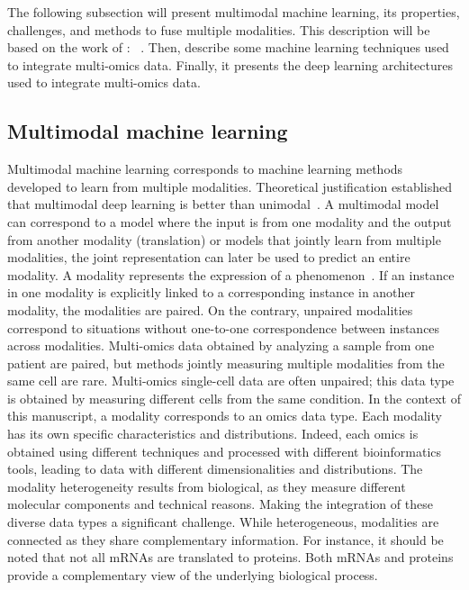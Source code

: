\documentclass[../main.tex]{subfiles}
\begin{document}
	The following subsection will present multimodal machine learning, its properties, challenges, and methods to fuse multiple modalities.
	This description will be based on the work of \citeauthor{MML_morency}: ~\cite{MML_morency}.
	Then, describe some machine learning techniques used to integrate multi-omics data.
	Finally, it presents the deep learning architectures used to integrate multi-omics data.

	\subsection{Multimodal machine learning}
	  Multimodal machine learning corresponds to machine learning methods developed to learn from multiple modalities.
	  Theoretical justification established that multimodal deep learning is better than unimodal~\cite{NEURIPS2021_5aa3405a}.
	  A multimodal model can correspond to a model where the input is from one modality and the output from another modality (translation) or models that jointly learn from multiple modalities, the joint representation can later be used to predict an entire modality.
	  A modality represents the expression of a phenomenon~\cite{MML_morency}.
	  If an instance in one modality is explicitly linked to a corresponding instance in another modality, the modalities are paired.
	  On the contrary, unpaired modalities correspond to situations without one-to-one correspondence between instances across modalities.
	  Multi-omics data obtained by analyzing a sample from one patient are paired, but methods jointly measuring multiple modalities from the same cell are rare.
	  Multi-omics single-cell data are often unpaired; this data type is obtained by measuring different cells from the same condition.
	  In the context of this manuscript, a modality corresponds to an omics data type.
	  Each modality has its own specific characteristics and distributions.
	  Indeed, each omics is obtained using different techniques and processed with different bioinformatics tools, leading to data with different dimensionalities and distributions.
	  The modality heterogeneity results from biological, as they measure different molecular components and technical reasons.
	  Making the integration of these diverse data types a significant challenge.
	  While heterogeneous, modalities are connected as they share complementary information.
	  For instance, it should be noted that not all mRNAs are translated to proteins.
	  Both mRNAs and proteins provide a complementary view of the underlying biological process.
\end{document}
